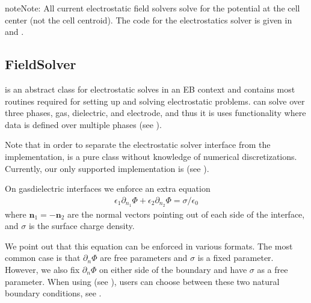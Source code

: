 \documentclass[letterpaper,10pt,english]{sphinxmanual}
\begin{document}
\begin{sphinxadmonition}{note}{Note:}
\sphinxAtStartPar
All current electrostatic field solvers solve for the potential at the cell center (not the cell centroid).
The code for the electrostatics solver is given in  and .
\end{sphinxadmonition}


\subsection{FieldSolver}
\label{\detokenize{Solvers/Electrostatics:fieldsolver}}
\sphinxAtStartPar
{} is an abstract class for electrostatic solves in an EB context and contains most routines required for setting up and solving electrostatic problems.
 can solve over three phases, gas, dielectric, and electrode, and thus it is uses  functionality where data is defined over multiple phases (see {\hyperref[\detokenize{Source/MeshData:chap-meshdata}]{}}).

\sphinxAtStartPar
Note that in order to separate the electrostatic solver interface from the implementation,  is a pure class without knowledge of numerical discretizations.
Currently, our only supported implementation is  (see {\hyperref[\detokenize{Solvers/Electrostatics:chap-fieldsolvermultigrid}]{}}).

\sphinxAtStartPar
On gas\sphinxhyphen{}dielectric interfaces we enforce an extra equation
\begin{equation}\label{equation:Solvers/Electrostatics:GaussBC}
\begin{split}\epsilon_1\partial_{n_1}\Phi + \epsilon_2\partial_{n_2}\Phi = \sigma/\epsilon_0\end{split}
\end{equation}
\sphinxAtStartPar
where \(\mathbf{n}_1 = -\mathbf{n}_2\) are the normal vectors pointing out of each side of the interface, and \(\sigma\) is the surface charge density.

\sphinxAtStartPar
We point out that this equation can be enforced in various formats.
The most common case is that \(\partial_n\Phi\) are free parameters and \(\sigma\) is a fixed parameter.
However, we  also fix \(\partial_n\Phi\) on either side of the boundary and have \(\sigma\) as a free parameter.
When using  (see {\hyperref[\detokenize{Solvers/Electrostatics:chap-fieldsolvermultigrid}]{}}), users can choose between these two natural boundary conditions, see {\hyperref[\detokenize{Solvers/Electrostatics:chap-poissonebbc}]{}}.
\end{document}

